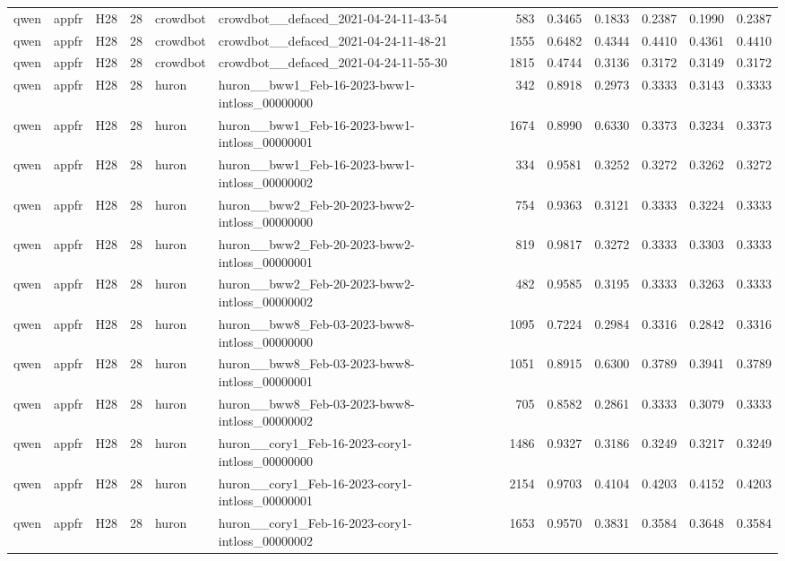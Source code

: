 \begin{table}[tbp]
\begin{tabular}{lllrllrrrrrr}
qwen & appfr & H28 & 28 & crowdbot & crowdbot\_\_defaced\_2021-04-24-11-43-54 & 583 & 0.3465 & 0.1833 & 0.2387 & 0.1990 & 0.2387 \\
qwen & appfr & H28 & 28 & crowdbot & crowdbot\_\_defaced\_2021-04-24-11-48-21 & 1555 & 0.6482 & 0.4344 & 0.4410 & 0.4361 & 0.4410 \\
qwen & appfr & H28 & 28 & crowdbot & crowdbot\_\_defaced\_2021-04-24-11-55-30 & 1815 & 0.4744 & 0.3136 & 0.3172 & 0.3149 & 0.3172 \\
qwen & appfr & H28 & 28 & huron & huron\_\_bww1\_Feb-16-2023-bww1-intloss\_00000000 & 342 & 0.8918 & 0.2973 & 0.3333 & 0.3143 & 0.3333 \\
qwen & appfr & H28 & 28 & huron & huron\_\_bww1\_Feb-16-2023-bww1-intloss\_00000001 & 1674 & 0.8990 & 0.6330 & 0.3373 & 0.3234 & 0.3373 \\
qwen & appfr & H28 & 28 & huron & huron\_\_bww1\_Feb-16-2023-bww1-intloss\_00000002 & 334 & 0.9581 & 0.3252 & 0.3272 & 0.3262 & 0.3272 \\
qwen & appfr & H28 & 28 & huron & huron\_\_bww2\_Feb-20-2023-bww2-intloss\_00000000 & 754 & 0.9363 & 0.3121 & 0.3333 & 0.3224 & 0.3333 \\
qwen & appfr & H28 & 28 & huron & huron\_\_bww2\_Feb-20-2023-bww2-intloss\_00000001 & 819 & 0.9817 & 0.3272 & 0.3333 & 0.3303 & 0.3333 \\
qwen & appfr & H28 & 28 & huron & huron\_\_bww2\_Feb-20-2023-bww2-intloss\_00000002 & 482 & 0.9585 & 0.3195 & 0.3333 & 0.3263 & 0.3333 \\
qwen & appfr & H28 & 28 & huron & huron\_\_bww8\_Feb-03-2023-bww8-intloss\_00000000 & 1095 & 0.7224 & 0.2984 & 0.3316 & 0.2842 & 0.3316 \\
qwen & appfr & H28 & 28 & huron & huron\_\_bww8\_Feb-03-2023-bww8-intloss\_00000001 & 1051 & 0.8915 & 0.6300 & 0.3789 & 0.3941 & 0.3789 \\
qwen & appfr & H28 & 28 & huron & huron\_\_bww8\_Feb-03-2023-bww8-intloss\_00000002 & 705 & 0.8582 & 0.2861 & 0.3333 & 0.3079 & 0.3333 \\
qwen & appfr & H28 & 28 & huron & huron\_\_cory1\_Feb-16-2023-cory1-intloss\_00000000 & 1486 & 0.9327 & 0.3186 & 0.3249 & 0.3217 & 0.3249 \\
qwen & appfr & H28 & 28 & huron & huron\_\_cory1\_Feb-16-2023-cory1-intloss\_00000001 & 2154 & 0.9703 & 0.4104 & 0.4203 & 0.4152 & 0.4203 \\
qwen & appfr & H28 & 28 & huron & huron\_\_cory1\_Feb-16-2023-cory1-intloss\_00000002 & 1653 & 0.9570 & 0.3831 & 0.3584 & 0.3648 & 0.3584 \\

\end{tabular}
\end{table}
